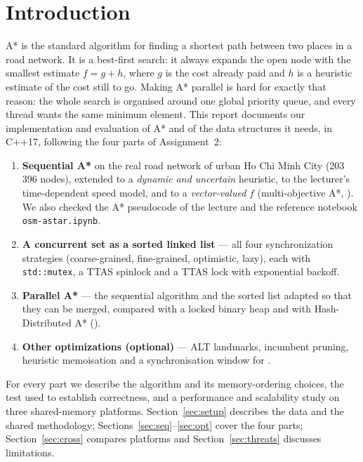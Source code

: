 \section*{Introduction}

A* is the standard algorithm for finding a shortest path between two places in
a road network. It is a best-first search: it always expands the open node with
the smallest estimate $f = g + h$, where $g$ is the cost already paid and $h$ is
a heuristic estimate of the cost still to go. Making A* parallel is hard for
exactly that reason: the whole search is organised around one global
priority queue, and every thread wants the same minimum element. This report
documents our implementation and evaluation of A* and of the data structures
it needs, in C++17, following the four parts of Assignment~2:

\begin{enumerate}[nosep]
  \item \textbf{Sequential A*} on the real road network of urban Ho Chi Minh
        City (203\,396 nodes), extended to a \emph{dynamic and uncertain}
        heuristic, to the lecturer's time-dependent speed model, and to a
        \emph{vector-valued} $f$ (multi-objective A*, \NAMOA). We also checked
        the A* pseudocode of the lecture and the reference notebook
        \texttt{osm-astar.ipynb}.
  \item \textbf{A concurrent set as a sorted linked list} --- all four
        synchronization strategies (coarse-grained, fine-grained,
        optimistic, lazy), each with \texttt{std::mutex}, a TTAS spinlock
        and a TTAS lock with exponential backoff.
  \item \textbf{Parallel A*} --- the sequential algorithm and the sorted list
        adapted so that they can be merged, compared with a locked binary heap
        and with Hash-Distributed A* (\HDA).
  \item \textbf{Other optimizations (optional)} --- ALT landmarks, incumbent
        pruning, heuristic memoisation and a synchronisation window for \HDA.
\end{enumerate}

For every part we describe the algorithm and its memory-ordering choices, the
test used to establish correctness, and a performance and scalability study on
three shared-memory platforms. Section~\ref{sec:setup} describes the data and
the shared methodology; Sections~\ref{sec:seq}--\ref{sec:opt} cover the four
parts; Section~\ref{sec:cross} compares platforms and Section~\ref{sec:threats}
discusses limitations.
